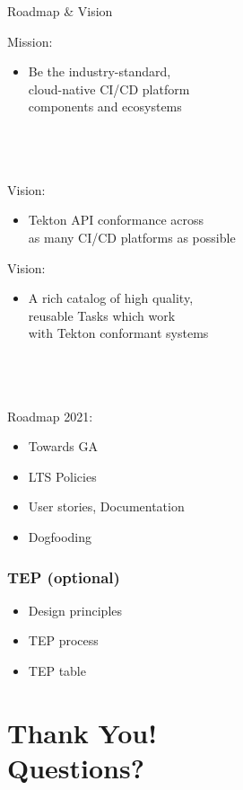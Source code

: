 \documentclass[aspectratio=169,11pt,hyperref={colorlinks=true}]{beamer}
\begin{document}
\begin{2columnsframe}{Roadmap \& Vision}%
  {%
  Mission:
  \begin{itemize}
    \item Be the industry-standard,\\
          cloud-native CI/CD platform \\
          components and ecosystems
  \end{itemize}
  ~\\
  ~\\
  ~\\
  Vision:
  \begin{itemize}
    \item Tekton API conformance across\\
          as many CI/CD platforms as possible
  \end{itemize}
  }{%
  Vision:
  \begin{itemize}
    \item A rich catalog of high quality,\\
          reusable Tasks which work\\
          with Tekton conformant systems
  \end{itemize}
  ~\\
  ~\\
  ~\\
  Roadmap 2021:
  \begin{itemize}
    \item Towards GA
    \item LTS Policies
    \item User stories, Documentation
    \item Dogfooding
  \end{itemize}
  }
\end{2columnsframe}

\begin{blackframe}
  \frametitle{TEP (optional)}
  \begin{itemize}
    \item Design principles
    \item TEP process
    \item TEP table
  \end{itemize}
\end{blackframe}

\section[Q\&A]{Thank You! \\Questions?}
\end{document}
